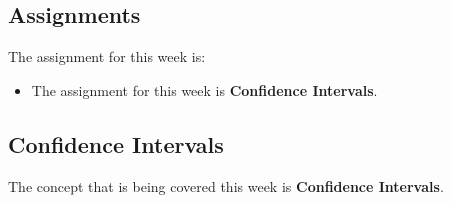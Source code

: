 \subsection{Assignments}

The assignment for this week is:

\begin{itemize}
    \item The assignment for this week is \textbf{Confidence Intervals}. 
\end{itemize}

\subsection{Confidence Intervals}

The concept that is being covered this week is \textbf{Confidence Intervals}.

